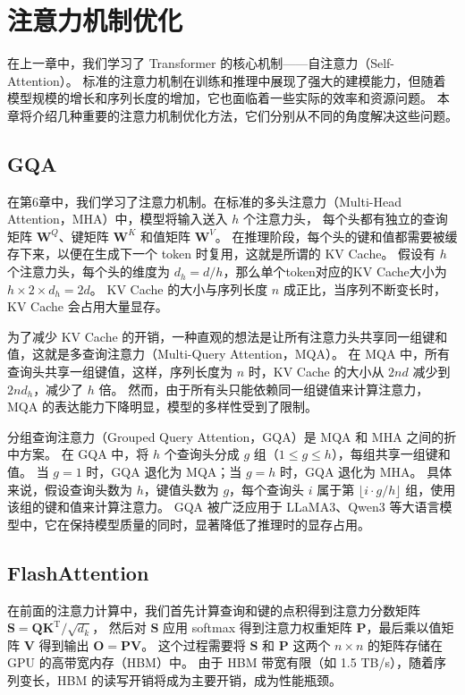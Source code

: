 \chapter{注意力机制优化}
在上一章中，我们学习了 Transformer 的核心机制——自注意力（Self-Attention）。
标准的注意力机制在训练和推理中展现了强大的建模能力，但随着模型规模的增长和序列长度的增加，它也面临着一些实际的效率和资源问题。
本章将介绍几种重要的注意力机制优化方法，它们分别从不同的角度解决这些问题。

\section{GQA}
在第6章中，我们学习了注意力机制。在标准的多头注意力（Multi-Head Attention，MHA）中，模型将输入送入 $h$ 个注意力头，
每个头都有独立的查询矩阵 $\boldsymbol{W}^Q$、键矩阵 $\boldsymbol{W}^K$ 和值矩阵 $\boldsymbol{W}^V$。
在推理阶段，每个头的键和值都需要被缓存下来，以便在生成下一个 token 时复用，这就是所谓的 KV Cache。
假设有 $h$ 个注意力头，每个头的维度为 $d_h = d / h$，那么单个token对应的KV Cache大小为 $h \times 2 \times d_h = 2d$。
KV Cache 的大小与序列长度 $n$ 成正比，当序列不断变长时，KV Cache 会占用大量显存。

为了减少 KV Cache 的开销，一种直观的想法是让所有注意力头共享同一组键和值，这就是多查询注意力（Multi-Query Attention，MQA）。
在 MQA 中，所有查询头共享一组键值，这样，序列长度为 $n$ 时，KV Cache 的大小从 $2nd$ 减少到 $2nd_h$，减少了 $h$ 倍。
然而，由于所有头只能依赖同一组键值来计算注意力，MQA 的表达能力下降明显，模型的多样性受到了限制。

分组查询注意力（Grouped Query Attention，GQA）是 MQA 和 MHA 之间的折中方案。
在 GQA 中，将 $h$ 个查询头分成 $g$ 组（$1 \leq g \leq h$），每组共享一组键和值。
当 $g = 1$ 时，GQA 退化为 MQA；当 $g = h$ 时，GQA 退化为 MHA。
具体来说，假设查询头数为 $h$，键值头数为 $g$，每个查询头 $i$ 属于第 $\lfloor i \cdot g / h \rfloor$ 组，使用该组的键和值来计算注意力。
GQA 被广泛应用于 LLaMA3、Qwen3 等大语言模型中，它在保持模型质量的同时，显著降低了推理时的显存占用。

\section{FlashAttention}
在前面的注意力计算中，我们首先计算查询和键的点积得到注意力分数矩阵 $\boldsymbol{S} = \boldsymbol{Q} \boldsymbol{K}^\mathrm{T} / \sqrt{d_k}$，
然后对 $\boldsymbol{S}$ 应用 softmax 得到注意力权重矩阵 $\boldsymbol{P}$，最后乘以值矩阵 $\boldsymbol{V}$ 得到输出 $\boldsymbol{O} = \boldsymbol{P} \boldsymbol{V}$。
这个过程需要将 $\boldsymbol{S}$ 和 $\boldsymbol{P}$ 这两个 $n \times n$ 的矩阵存储在 GPU 的高带宽内存（HBM）中。
由于 HBM 带宽有限（如 1.5 TB/s），随着序列变长，HBM 的读写开销将成为主要开销，成为性能瓶颈。

